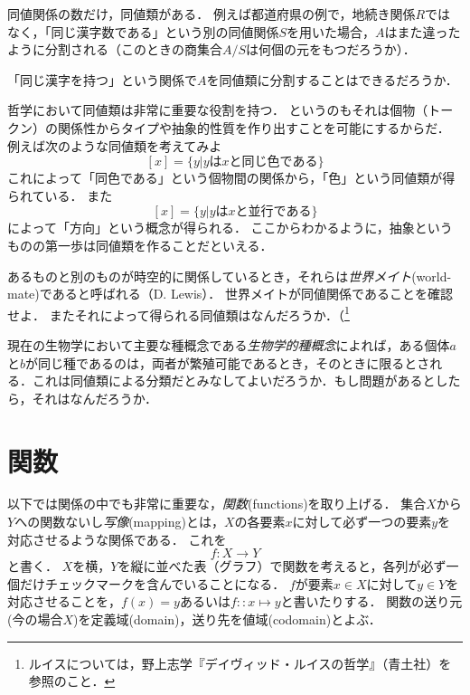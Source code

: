 \documentclass[11pt,a4paper]{jsarticle} %
\begin{document}
同値関係の数だけ，同値類がある．
例えば都道府県の例で，地続き関係$R$ではなく，「同じ漢字数である」という別の同値関係$S$を用いた場合，$A$はまた違ったように分割される（このときの商集合$A/S$は何個の元をもつだろうか）．

\begin{exercise}
「同じ漢字を持つ」という関係で$A$を同値類に分割することはできるだろうか．
\end{exercise}

哲学において同値類は非常に重要な役割を持つ．
というのもそれは個物（トークン）の関係性からタイプや抽象的性質を作り出すことを可能にするからだ．
例えば次のような同値類を考えてみよ
\[
 [x] = \{ y | y \text{は} x \text{と同じ色である}\}
\]
これによって「同色である」という個物間の関係から，「色」という同値類が得られている．
また
\[
 [x] = \{ y | y \text{は} x \text{と並行である}\}
\]
によって「方向」という概念が得られる．
ここからわかるように，抽象というものの第一歩は同値類を作ることだといえる．


\begin{example}
 あるものと別のものが時空的に関係しているとき，それらは\emph{世界メイト}(world-mate)であると呼ばれる（D. Lewis）．
 世界メイトが同値関係であることを確認せよ．
 またそれによって得られる同値類はなんだろうか．（\footnote{ルイスについては，野上志学『デイヴィッド・ルイスの哲学』（青土社）を参照のこと．}
\end{example}


\begin{example}
 現在の生物学において主要な種概念である\emph{生物学的種概念}によれば，ある個体$a$と$b$が同じ種であるのは，両者が繁殖可能であるとき，そのときに限るとされる．これは同値類による分類だとみなしてよいだろうか．もし問題があるとしたら，それはなんだろうか．
\end{example}



\section{関数}
以下では関係の中でも非常に重要な，\emph{関数}(functions)を取り上げる．
集合$X$から$Y$への関数ないし\emph{写像}(mapping)とは，$X$の各要素$x$に対して必ず一つの要素$y$を対応させるような関係である．
これを
\[
 f : X \to Y
\]
と書く．
$X$を横，$Y$を縦に並べた表（グラフ）で関数を考えると，各列が必ず一個だけチェックマークを含んでいることになる．
$f$が要素$x \in X$に対して$y \in Y$を対応させることを，$f(x)=y$あるいは$f::x \mapsto y$と書いたりする．
関数の送り元(今の場合$X$)を定義域(domain)，送り先を値域(codomain)とよぶ．
\end{document}
